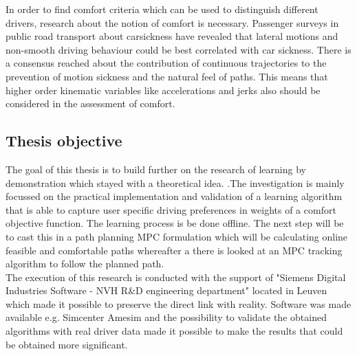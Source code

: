 In order to find comfort criteria which can be used to distinguish different drivers, research about the notion of comfort is necessary. Passenger surveys in public road transport about carsickness \cite{Turner1999} have revealed that lateral motions and non-smooth driving behaviour could be best correlated with car sickness. There is a consensus reached about the contribution of continuous trajectories to the prevention of motion sickness and the natural feel of paths.\cite{Elbanhawi2015} This means that higher order kinematic variables like accelerations and jerks also should be considered in the assessment of comfort.\\

\subsection{Thesis objective}
The goal of this thesis is to build further on the research of learning by demonstration which stayed with a theoretical idea. \cite{Kuderer2015a}.The investigation is mainly focussed on the practical implementation and validation of a learning algorithm that is able to capture user specific driving preferences in weights of a comfort objective function. The learning process is be done offline. The next step will be to cast this in a path planning MPC formulation which will be calculating online feasible and comfortable paths whereafter a there is looked at an MPC tracking algorithm to follow the planned path. \\

The execution of this research is conducted with the support of "Siemens Digital Industries Software - NVH R\&D engineering department" located in Leuven which made it possible to preserve the direct link with reality. Software was made available e.g. Simcenter Amesim and the possibility to validate the obtained algorithms with real driver data made it possible to make the results that could be obtained more significant.\\



